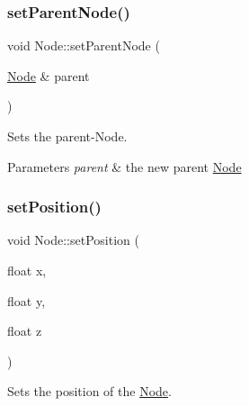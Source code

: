 \subsubsection{\texorpdfstring{setParentNode()}{setParentNode()}}
{\footnotesize\ttfamily void Node\+::set\+Parent\+Node (\begin{DoxyParamCaption}\item[{\mbox{\hyperlink{classsage_1_1Node}{Node}} \&}]{parent }\end{DoxyParamCaption})\hspace{0.3cm}{\ttfamily [protected]}}



Sets the parent-\/\+Node. 


\begin{DoxyParams}{Parameters}
{\em parent} & the new parent \mbox{\hyperlink{classsage_1_1Node}{Node}} \\
\hline
\end{DoxyParams}
\mbox{\label{classsage_1_1Node_ad9899110e543c6b16997512e47c142c9}} 
\subsubsection{\texorpdfstring{setPosition()}{setPosition()}\hspace{0.1cm}{\footnotesize\ttfamily [1/4]}}
{\footnotesize\ttfamily void Node\+::set\+Position (\begin{DoxyParamCaption}\item[{float}]{x,  }\item[{float}]{y,  }\item[{float}]{z }\end{DoxyParamCaption})}



Sets the position of the \mbox{\hyperlink{classsage_1_1Node}{Node}}. 


